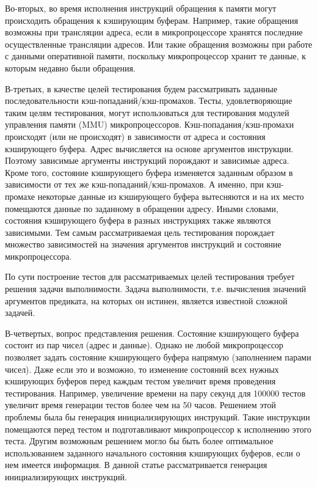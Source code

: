 Во-вторых, во время исполнения инструкций обращения к памяти могут
происходить обращения к кэширующим буферам. Например, такие
обращения возможны при трансляции адреса, если в микропроцессоре
хранятся последние осуществленные трансляции адресов. Или такие
обращения возможны при работе с данными оперативной памяти,
поскольку микропроцессор хранит те данные, к которым недавно были
обращения.

В-третьих, в качестве целей тестирования будем рассматривать
заданные последовательности кэш-попаданий/кэш-промахов. Тесты,
удовлетворяющие таким целям тестирования, могут использоваться для
тестирования модулей управления памяти (MMU) микропроцессоров.
Кэш-попадания/кэш-промахи происходят (или не происходят) в
зависимости от адреса и состояния кэширующего буфера. Адрес
вычисляется на основе аргументов инструкции. Поэтому зависимые
аргументы инструкций порождают и зависимые адреса. Кроме того,
состояние кэширующего буфера изменяется заданным образом в
зависимости от тех же кэш-попаданий/кэш-промахов. А именно, при
кэш-промахе некоторые данные из кэширующего буфера вытесняются и на
их место помещаются данные по заданному в обращении адресу. Иными
словами, состояния кэширующего буфера в разных инструкциях также
являются зависимыми. Тем самым рассматриваемая цель тестирования
порождает множество зависимостей на значения аргументов инструкций и
состояние микропроцессора.

По сути построение тестов для рассматриваемых целей тестирования
требует решения задачи выполнимости. Задача выполнимости, т.е.
вычисления значений аргументов предиката, на которых он истинен,
является известной сложной задачей.

В-четвертых, вопрос представления решения. Состояние кэширующего
буфера состоит из пар чисел (адрес и данные). Однако не любой
микропроцессор позволяет задать состояние кэширующего буфера
напрямую (заполнением парами чисел). Даже если это и возможно, то
изменение состояний всех нужных кэширующих буферов перед каждым
тестом увеличит время проведения тестирования. Например, увеличение
времени на пару секунд для 100000 тестов увеличит время генерации
тестов более чем на 50 часов. Решением этой проблемы была бы
генерация инициализирующих инструкций. Такие инструкции помещаются
перед тестом и подготавливают микропроцессор к исполнению этого
теста. Другим возможным решением могло бы быть более оптимальное
использованием заданного начального состояния кэширующих буферов,
если о нем имеется информация. В данной статье рассматривается
генерация инициализирующих инструкций.
